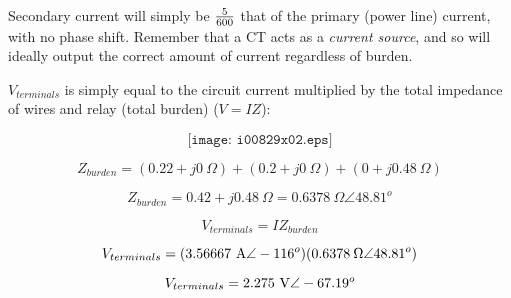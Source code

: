 





Secondary current will simply be $5 \over 600$ that of the primary (power line) current, with no phase shift.  Remember that a CT acts as a {\it current source}, and so will ideally output the correct amount of current regardless of burden.

\vskip 10pt

$V_{terminals}$ is simply equal to the circuit current multiplied by the total impedance of wires and relay (total burden) ($V = IZ$):

$$\texttt{[image: i00829x02.eps]}$$

$$Z_{burden} = (0.22 + j0 \> \Omega) + (0.2 + j0 \> \Omega) + (0 + j0.48 \> \Omega)$$

$$Z_{burden} = 0.42 + j0.48 \> \Omega = 0.6378 \> \Omega \angle 48.81^o$$

\vskip 10pt

$$V_{terminals} = I Z_{burden}$$

$$V_{terminals} = (3.56667 \hbox{ A} \angle -116^o) (0.6378 \> \Omega \angle 48.81^o)$$

$$V_{terminals} = 2.275 \hbox{ V} \angle -67.19^o$$




